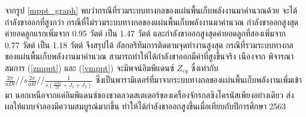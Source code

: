 \documentclass[11pt,a4paper]{article}
\begin{document}
จากรูป \ref{mppt_graph} พบว่ากรณีที่รวมระบบทางกลของแผ่นพื้นเก็บพลังงานมาคำนวณด้วย จะได้กำลังขาออกที่สูงกว่า กรณีที่ไม่รวมระบบทางกลของแผ่นพื้นเก็บพลังงานมาคำนวณ
กำลังขาออกสูงสุดค่ายอดลูกแรกเพิ่มจาก 0.95 วัตต์ เป็น 1.47 วัตต์ และกำลังขาออกสูงสุดค่ายอดลูกที่สองเพิ่มจาก 0.77 วัตต์ เป็น 1.18 วัตต์ จึงสรุปได้ อัลกอริทึมการติดตามจุดทำงานสูงสุด กรณีที่รวมระบบทางกลของแผ่นพื้นเก็บพลังงานมาคำนวณ สามารถทำให้ได้กำลังขาออกมีค่าที่สูงขึ้นจริง
เนืองจาก พิจารณาสมการ (\ref{zmppt}) และ (\ref{vmppt}) จะมีพจน์อิมพีแดนซ์ $Z_{eq}$ ซึ่งเท่ากับ $ \frac{2\pi}{aDl} // s \frac{2\pi }{akl} // \frac{1}{s( \frac{aml}{2\pi} + J_{1} + J_{2} ) }   $
ซึ่งเป็นพารามิเตอร์ที่มาจากระบบทางกลของแผ่นพื้นเก็บพลังงานเพิ่มเข้ามา นอกเหนือจากแค่อิมพีแดนซ์ของขวดลวดสเตเตอร์ของเครื่องจักรกลซิงโครนัสเพียงอย่างเดียว ส่งผลให้แบบจำลองมีความสมบูรณ์มากขึ้น ทำให้ได้กำลังขาออกสูงขึ้นเมื่อเทียบกับปีการศึกษา 2563










\end{document}

